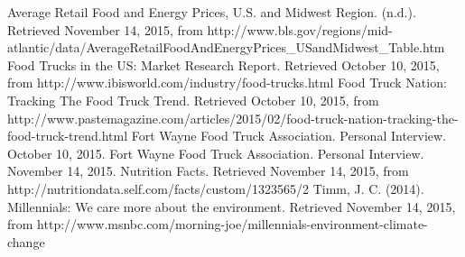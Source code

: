 \documentclass[12pt, letterpaper]{article}
\begin{document}
\begin{thebibliography}{9}

		Average Retail Food and Energy Prices, U.S. and Midwest Region. (n.d.). Retrieved November 14, 2015, from http://www.bls.gov/regions/mid-atlantic/data/AverageRetailFoodAndEnergyPrices\_USandMidwest\_Table.htm
        Food Trucks in the US: Market Research Report. Retrieved October 10, 2015, from http://www.ibisworld.com/industry/food-trucks.html
        Food Truck Nation: Tracking The Food Truck Trend. Retrieved October 10, 2015, from http://www.pastemagazine.com/articles/2015/02/food-truck-nation-tracking-the-food-truck-trend.html
        Fort Wayne Food Truck Association. Personal Interview. October 10, 2015.
	    Fort Wayne Food Truck Association. Personal Interview. November 14, 2015.
	    Nutrition Facts. Retrieved November 14, 2015, from http://nutritiondata.self.com/facts/custom/1323565/2
		Timm, J. C. (2014). Millennials: We care more about the environment. Retrieved November 14, 2015, from http://www.msnbc.com/morning-joe/millennials-environment-climate-change

\end{thebibliography}

\newpage

\end{document}
